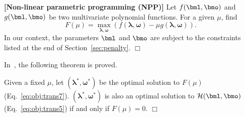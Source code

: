 %
%
\begin{definition}
\label{def:npp}
\textbf{[Non-linear parametric programming (NPP)]}
Let $f(\bml,\bmo)$ and $g(\bml,\bmo)$ be two multivariate polynomial functions. For a given $\mu$, find
\begin{equation}
\label{eq:obj:trans7}
F(\mu) = \max_{\bm \lambda, \bm \omega} \left( f(\bm \lambda, \bm \omega) - \mu g(\bm \lambda, \bm \omega) \right).
\end{equation}
In our context, the parameters $\bml$ and $\bmo$ are subject to the constraints listed at the end of Section~\ref{sec:penalty}.
\hfill$\Box$
\end{definition}
In~\cite{dinkelbach1967nonlinear}, the following theorem is proved.
\begin{theorem}
\label{theorem2}
Given a fixed $\mu$, let $({\bm \lambda^*}, {\bm \omega^*})$ be the optimal solution to $F(\mu)$ (Eq.~\ref{eq:obj:trans7}).
$(\bm \lambda^*, \bm \omega^*)$ is also an optimal solution to $\mathcal{H}(\bml, \bmo)$ (Eq.~\ref{eq:obj:trans5}) if and only if $F(\mu) = 0$.
\hfill$\Box$
\end{theorem}

